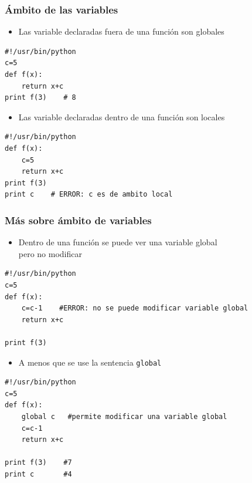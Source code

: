 \documentclass{beamer}
\begin{document}
\begin{frame}[fragile]
\frametitle{Ámbito de las variables}
\begin{itemize}
\item 
Las variable declaradas fuera de una función son globales
\end{itemize}
  \begin{footnotesize}
\begin{verbatim}
#!/usr/bin/python
c=5
def f(x):
    return x+c
print f(3)    # 8
\end{verbatim}
  \end{footnotesize}

\begin{itemize}
\item 
Las variable declaradas dentro de una función son locales
\end{itemize}

  \begin{footnotesize}
\begin{verbatim}
#!/usr/bin/python
def f(x):
    c=5
    return x+c
print f(3)
print c    # ERROR: c es de ambito local
\end{verbatim}
  \end{footnotesize}


\end{frame}


\begin{frame}[fragile]
\frametitle{Más sobre ámbito de variables}

\begin{itemize}
\item 
Dentro de una función se puede ver una variable global\\
pero no modificar
\end{itemize}
  \begin{footnotesize}
\begin{verbatim}
#!/usr/bin/python
c=5
def f(x):
    c=c-1    #ERROR: no se puede modificar variable global
    return x+c
    
print f(3)
\end{verbatim}
  \end{footnotesize}

\begin{itemize}
\item 
A menos que se use la sentencia \verb|global|
\end{itemize}



  \begin{footnotesize}
\begin{verbatim}
#!/usr/bin/python
c=5
def f(x):
    global c   #permite modificar una variable global
    c=c-1   
    return x+c
    
print f(3)    #7
print c       #4
\end{verbatim}
  \end{footnotesize}


\end{frame}
\end{document}

